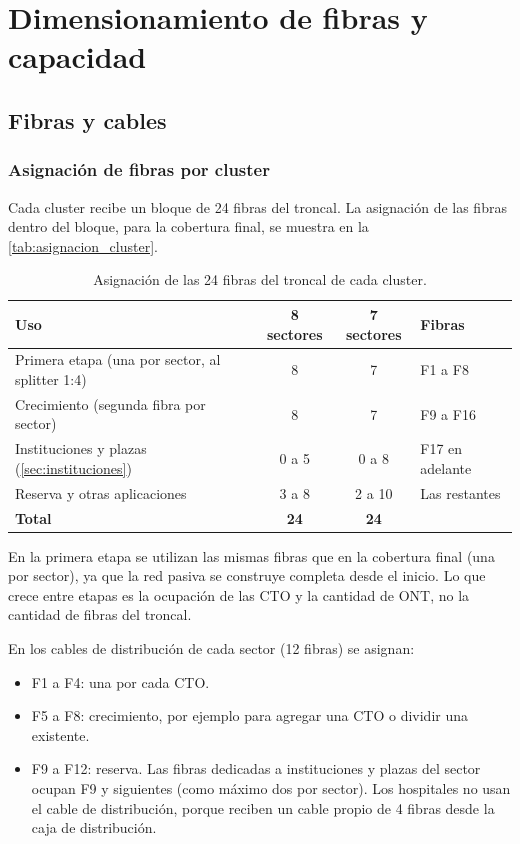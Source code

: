 \section{Dimensionamiento de fibras y capacidad}
\label{sec:dimensionamiento}

\subsection{Fibras y cables}
\label{sec:fibras}

\subsubsection{Asignación de fibras por cluster}
Cada cluster recibe un bloque de 24 fibras del troncal. La asignación de las fibras dentro del bloque, para la cobertura final, se muestra en la \autoref{tab:asignacion_cluster}.

\begin{table}[H]
    \centering
    \footnotesize
    \caption{Asignación de las 24 fibras del troncal de cada cluster.}
    \label{tab:asignacion_cluster}
    \begin{tabular}{|p{6.0cm}|c|c|p{2.6cm}|}
        \hline
        \textbf{Uso} & \textbf{8 sectores} & \textbf{7 sectores} & \textbf{Fibras} \\
        \hline
        Primera etapa (una por sector, al splitter 1:4) & 8 & 7 & F1 a F8 \\
        Crecimiento (segunda fibra por sector) & 8 & 7 & F9 a F16 \\
        Instituciones y plazas (\autoref{sec:instituciones}) & 0 a 5 & 0 a 8 & F17 en adelante \\
        Reserva y otras aplicaciones & 3 a 8 & 2 a 10 & Las restantes \\
        \hline
        \textbf{Total} & \textbf{24} & \textbf{24} & \\
        \hline
    \end{tabular}
\end{table}

En la primera etapa se utilizan las mismas fibras que en la cobertura final (una por sector), ya que la red pasiva se construye completa desde el inicio. Lo que crece entre etapas es la ocupación de las CTO y la cantidad de ONT, no la cantidad de fibras del troncal.

En los cables de distribución de cada sector (12 fibras) se asignan:
\begin{itemize}
    \item F1 a F4: una por cada CTO.
    \item F5 a F8: crecimiento, por ejemplo para agregar una CTO o dividir una existente.
    \item F9 a F12: reserva. Las fibras dedicadas a instituciones y plazas del sector ocupan F9 y siguientes (como máximo dos por sector). Los hospitales no usan el cable de distribución, porque reciben un cable propio de 4 fibras desde la caja de distribución.
\end{itemize}

